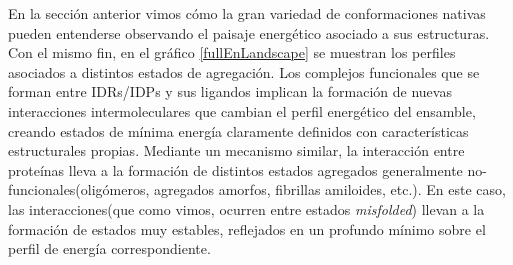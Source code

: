 En la sección anterior vimos cómo la gran variedad de conformaciones nativas pueden entenderse observando el paisaje energético asociado a sus estructuras.
Con el mismo fin, en el gráfico \ref{fullEnLandscape} se muestran los perfiles asociados a distintos estados de agregación.
Los complejos funcionales que se forman entre IDRs/IDPs y sus ligandos implican la formación de nuevas interacciones intermoleculares que cambian el perfil energético del ensamble,
creando estados de mínima energía claramente definidos con características estructurales propias.
Mediante un mecanismo similar, la interacción entre proteínas lleva a la formación de distintos estados agregados generalmente no-funcionales(oligómeros, agregados amorfos, fibrillas amiloides, etc.).  
En este caso, las interacciones(que como vimos, ocurren entre estados \textit{misfolded}) llevan a la formación de estados muy estables, reflejados en un profundo mínimo sobre el perfil de energía correspondiente. 


